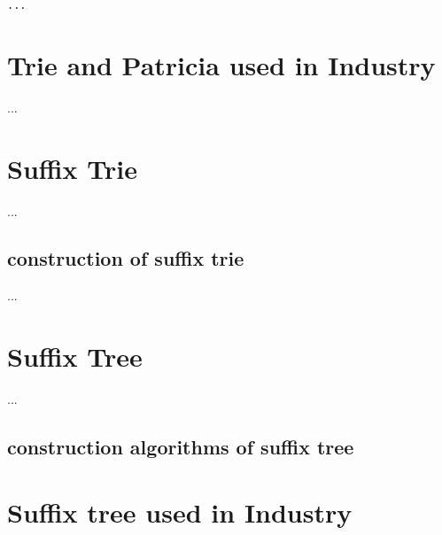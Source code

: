 \documentclass{article}
\begin{document}
\lstset{language=lisp}
\begin{lstlisting}
...
\end{lstlisting}

\section{Trie and Patricia used in Industry}
...

\section{Suffix Trie}
...

\subsection{construction of suffix trie}
...

\section{Suffix Tree}
...

\subsection{construction algorithms of suffix tree}

\section{Suffix tree used in Industry}

\end{document}

